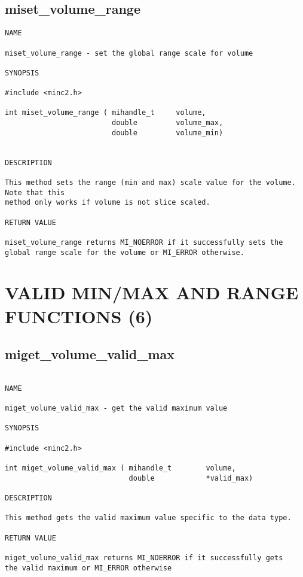 \documentclass{article}
\begin{document}
\subsection{miset\_volume\_range}
\begin{verbatim}
NAME

miset_volume_range - set the global range scale for volume

SYNOPSIS

#include <minc2.h>

int miset_volume_range ( mihandle_t     volume,
                         double         volume_max,
                         double         volume_min)


DESCRIPTION

This method sets the range (min and max) scale value for the volume. Note that this 
method only works if volume is not slice scaled.

RETURN VALUE

miset_volume_range returns MI_NOERROR if it successfully sets the
global range scale for the volume or MI_ERROR otherwise.
\end{verbatim}

\section{VALID MIN/MAX AND RANGE FUNCTIONS (6)}
\subsection{miget\_volume\_valid\_max}
\begin{verbatim}

NAME 

miget_volume_valid_max - get the valid maximum value 

SYNOPSIS

#include <minc2.h>

int miget_volume_valid_max ( mihandle_t        volume,
                             double            *valid_max)
                                
DESCRIPTION

This method gets the valid maximum value specific to the data type.

RETURN VALUE

miget_volume_valid_max returns MI_NOERROR if it successfully gets 
the valid maximum or MI_ERROR otherwise
\end{verbatim}
\end{document}
